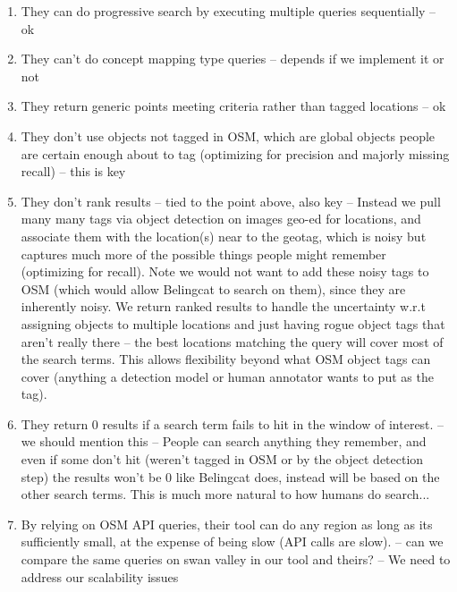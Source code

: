 \begin{enumerate}
\item They can do progressive search by executing multiple queries sequentially -- ok
\item They can't do concept mapping type queries -- depends if we implement it or not
\item They return generic points meeting criteria rather than tagged locations -- ok
\item They don't use objects not tagged in OSM, which are global objects people are certain enough about to tag (optimizing for precision and majorly missing recall) -- this is key
\item They don't rank results -- tied to the point above, also key
-- Instead we pull many many tags via object detection on images geo-ed for locations, and associate them with the location(s) near to the geotag, which is noisy but captures much more of the possible things people might remember (optimizing for recall). Note we would not want to add these noisy tags to OSM (which would allow Belingcat to search on them), since they are inherently noisy. We return ranked results to handle the uncertainty w.r.t assigning objects to multiple locations and just having rogue object tags that aren't really there -- the best locations matching the query will cover most of the search terms. This allows flexibility beyond what OSM object tags can cover (anything a detection model or human annotator wants to put as the tag).

\item They return 0 results if a search term fails to hit in the window of interest. -- we should mention this
-- People can search anything they remember, and even if some don't hit (weren't tagged in OSM or by the object detection step) the results won't be 0 like Belingcat does, instead will be based on the other search terms. This is much more natural to how humans do search... 
\item By relying on OSM API queries, their tool can do any region as long as its sufficiently small, at the expense of being slow (API calls are slow). -- can we compare the same queries on swan valley in our tool and theirs?
-- We need to address our scalability issues
\end{enumerate}



